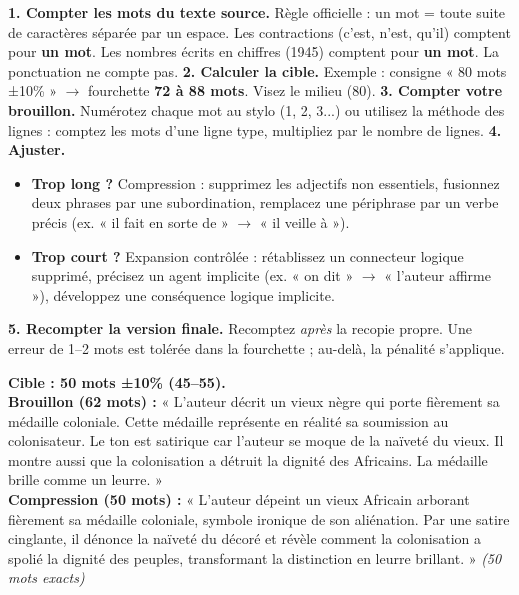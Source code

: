 \documentclass[11pt]{article}
\begin{document}
\begin{methode}
\textbf{1. Compter les mots du texte source.} Règle officielle : un mot = toute suite de caractères séparée par un espace. Les contractions (c'est, n'est, qu'il) comptent pour \textbf{un mot}. Les nombres écrits en chiffres (1945) comptent pour \textbf{un mot}. La ponctuation ne compte pas.
\textbf{2. Calculer la cible.} Exemple : consigne « 80 mots ±10\% » $\rightarrow$ fourchette \textbf{72 à 88 mots}. Visez le milieu (80).
\textbf{3. Compter votre brouillon.} Numérotez chaque mot au stylo (1, 2, 3...) ou utilisez la méthode des lignes : comptez les mots d'une ligne type, multipliez par le nombre de lignes.
\textbf{4. Ajuster.}
\begin{itemize}
\item \textbf{Trop long ?} Compression : supprimez les adjectifs non essentiels, fusionnez deux phrases par une subordination, remplacez une périphrase par un verbe précis (ex. « il fait en sorte de » $\rightarrow$ « il veille à »).
\item \textbf{Trop court ?} Expansion contrôlée : rétablissez un connecteur logique supprimé, précisez un agent implicite (ex. « on dit » $\rightarrow$ « l'auteur affirme »), développez une conséquence logique implicite.
\end{itemize}
\textbf{5. Recompter la version finale.} Recomptez \emph{après} la recopie propre. Une erreur de 1--2 mots est tolérée dans la fourchette ; au-delà, la pénalité s'applique.
\end{methode}

\begin{exemplebox}
\textbf{Cible : 50 mots ±10\% (45--55).}
\\
\textbf{Brouillon (62 mots) :} « L'auteur décrit un vieux nègre qui porte fièrement sa médaille coloniale. Cette médaille représente en réalité sa soumission au colonisateur. Le ton est satirique car l'auteur se moque de la naïveté du vieux. Il montre aussi que la colonisation a détruit la dignité des Africains. La médaille brille comme un leurre. »
\\
\textbf{Compression (50 mots) :} « L'auteur dépeint un vieux Africain arborant fièrement sa médaille coloniale, symbole ironique de son aliénation. Par une satire cinglante, il dénonce la naïveté du décoré et révèle comment la colonisation a spolié la dignité des peuples, transformant la distinction en leurre brillant. » \textit{(50 mots exacts)}
\end{exemplebox}
\end{document}
